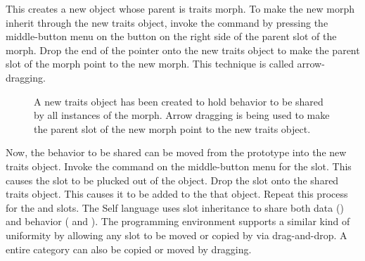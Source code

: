 \documentclass[letterpaper,10pt,english]{sphinxmanual}
\begin{document}
\begin{sphinxVerbatim}[commandchars=\\\{\}]
     
\end{sphinxVerbatim}

This creates a new object whose parent is traits morph. To make the new morph inherit through the new traits object, invoke the  command by pressing the middle-button menu on the button on the right side of the parent slot of the morph. Drop the end of the pointer onto the new traits object to make the parent slot of the morph point to the new morph. This technique is called \sphinxquotedblleft{}arrow-dragging\sphinxquotedblright{}.
\begin{figure}[htbp]
\centering
\capstart

\noindent{}
\caption{A new traits object has been created to hold behavior to be shared by all instances of the morph. Arrow dragging is being used to make the parent slot of the new morph point to the new traits object.}\label{\detokenize{morphic:id7}}\end{figure}

Now, the behavior to be shared can be moved from the prototype into the new traits object. Invoke the  command on the middle-button menu for the  slot. This causes the slot to be plucked out of the object. Drop the slot onto the shared traits object. This causes it to be added to the that object. Repeat this process for the  and  slots.
\newpage
The Self language uses slot inheritance to share both data () and behavior ( and ). The programming environment supports a similar kind of uniformity by allowing any slot to be moved or copied by via drag-and-drop. A entire category can also be copied or moved by dragging.
\end{document}
